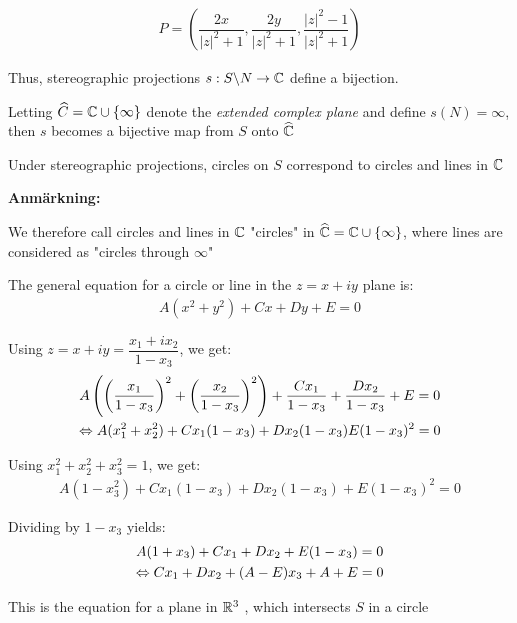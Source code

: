 \begin{equation*}
  \begin{gathered}
    P = \left(\dfrac{2x}{\left|z\right|^2+1},\dfrac{2y}{\left|z\right|^2+1},\dfrac{\left|z\right|^2-1}{\left|z\right|^2+1}\right)
  \end{gathered}
\end{equation*}
\par\bigskip
\noindent Thus, stereographic projections $s:S\backslash N\to\mathbb{C}$ define a bijection.
\par\bigskip
\noindent Letting $\widehat{C} = \mathbb{C}\cup\left\{\infty\right\}$ denote the \textit{extended complex plane} and define $s(N) = \infty$, then $s$ becomes a bijective map from $S$ onto $\widehat{\mathbb{C}}$
\par\bigskip
\begin{theo}[]{}
  Under stereographic projections, circles on $S$ correspond to circles and lines in $\mathbb{C}$
\end{theo}
\par\bigskip
\noindent\textbf{Anmärkning:}\par
\noindent We therefore call circles and lines in $\mathbb{C}$ "circles" in $\widehat{\mathbb{C}} = \mathbb{C}\cup\left\{\infty\right\}$, where lines are considered as "circles through $\infty$"
\newpage
\begin{prf}[]{}
  The general equation for a circle or line in the $z = x+iy$ plane is:
  \begin{equation*}
    \begin{gathered}
      A(x^2+y^2)+Cx+Dy+E = 0
    \end{gathered}
  \end{equation*}
  \par\bigskip
  \noindent Using $z = x+iy = \dfrac{x_1+ix_2}{1-x_3}$, we get:
  \begin{equation*}
    \begin{gathered}
      A\left(\left(\dfrac{x_1}{1-x_3}\right)^2+\left(\dfrac{x_2}{1-x_3}\right)^2\right)+\dfrac{Cx_1}{1-x_3}+\dfrac{Dx_2}{1-x_3}+E=0\\
      \Leftrightarrow A(x_1^2+x_2^2)+Cx_1(1-x_3)+Dx_2(1-x_3)E(1-x_3)^2=0
    \end{gathered}
  \end{equation*}
  \par\bigskip
  \noindent Using $x_1^2+x_2^2+x_3^2=1$, we get:
  \begin{equation*}
    \begin{gathered}
      A(1-x_3^2)+Cx_1(1-x_3)+Dx_2(1-x_3)+E(1-x_3)^2 = 0
    \end{gathered}
  \end{equation*}
  \par\bigskip
  \noindent Dividing by $1-x_3$ yields:
  \begin{equation*}
    \begin{gathered}
      A(1+x_3)+Cx_1+Dx_2+E(1-x_3)=0\\
      \Leftrightarrow Cx_1+Dx_2+(A-E)x_3+A+E=0
    \end{gathered}
  \end{equation*}
  \par\bigskip
  \noindent This is the equation for a plane in $\mathbb{R}^3$ , which intersects $S$ in a circle
\end{prf}
\par\bigskip
